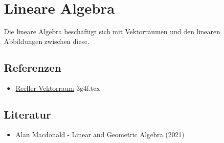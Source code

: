 \documentclass{sajzk}
\begin{document}
\section{Lineare Algebra} 
\label{jtfm}

Die lineare Algebra beschäftigt sich mit Vektorräumen und den linearen Abbildungen zwischen diese.

\subsection{Referenzen} 

\begin{itemize}
  \item \href{3g4f.pdf}{Reeller Vektorraum} 3g4f.tex
\end{itemize}

\subsection{Literatur} 

\begin{itemize}
  \item Alan Macdonald - Linear and Geometric Algebra (2021)
\end{itemize}
\end{document}
